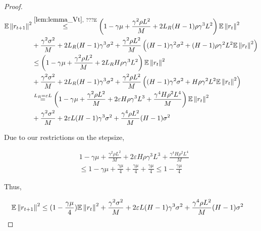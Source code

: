 \begin{proof}
\begin{align}
    \mathbb{E} \left\|r_{t+1}\right\|^2 
    &\overset{\ref{lem:lemma_Vt},\ ???\mathbb{E}}{\leq}
    \left( 1 - \gamma \mu + \frac{\gamma^2 \rho L^2 }{M} + 2 L_R (H-1) \rho \gamma^3 L^2 \right)
    \mathbb{E} \left\|r_t\right\|^2 \\
    &+ \frac{\gamma^2 \sigma^2}{M} + 2 L_R (H-1) \gamma^3 \sigma^2 + \frac{\gamma^2 \rho L^2 }{M} \left((H-1) \gamma^2 \sigma^2 + (H-1) \rho \gamma^2 L^2 \mathbb{E} \left\|r_t\right\|^2 \right) \\
    &\leq
    \left( 1 - \gamma \mu + \frac{\gamma^2 \rho L^2 }{M} + 2 L_R H \rho \gamma^3 L^2 \right)
    \mathbb{E} \left\|r_t\right\|^2 \\
    &+ \frac{\gamma^2 \sigma^2}{M} + 2 L_R (H-1) \gamma^3 \sigma^2 + \frac{\gamma^2 \rho L^2 }{M} \left((H-1) \gamma^2 \sigma^2 + H \rho \gamma^2 L^2 \mathbb{E} \left\|r_t\right\|^2 \right) \\
    &\overset{L_R = \varepsilon L}{=}
    \left( 1 - \gamma \mu + \frac{\gamma^2 \rho L^2 }{M} + 2 \varepsilon H \rho \gamma^3 L^3 + \frac{\gamma^4 H \rho^2 L^4 }{M} \right)
    \mathbb{E} \left\|r_t\right\|^2 \\
    &+ \frac{\gamma^2 \sigma^2}{M} + 2 \varepsilon L (H-1) \gamma^3 \sigma^2 + \frac{\gamma^4 \rho L^2 }{M} (H-1)\sigma^2
\end{align}



Due to our restrictions on the stepsize,

\begin{align}
    &1 - \gamma \mu + \frac{\gamma^2 \rho L^2 }{M} + 2 \varepsilon H \rho \gamma^3 L^3 + \frac{\gamma^4 H \rho^2 L^4 }{M} \\
    &\leq
    1 - \gamma \mu + \frac{\gamma \mu}{4} + \frac{\gamma \mu}{4} + \frac{\gamma \mu}{4} \leq
    1 - \frac{\gamma \mu}{4}
\end{align}

Thus,

\begin{align}
    \mathbb{E} \left\|r_{t+1}\right\|^2
    &\leq
    (1 - \frac{\gamma \mu}{4})\mathbb{E} \left\|r_t\right\|^2 
    + \frac{\gamma^2 \sigma^2}{M} + 2 \varepsilon L (H-1) \gamma^3 \sigma^2 + \frac{\gamma^4 \rho L^2 }{M} (H-1) \sigma^2
\end{align}

\end{proof}